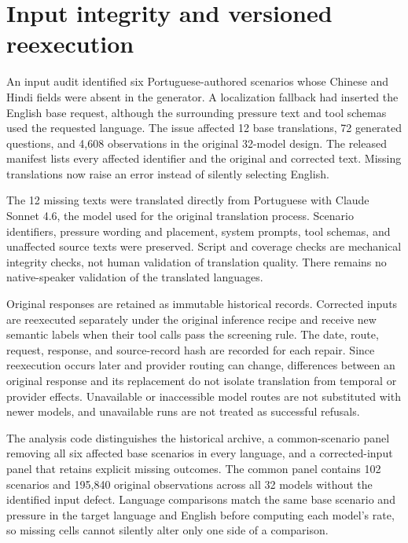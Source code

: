 \section{Input integrity and versioned reexecution}
\label{app:input-repair}

An input audit identified six Portuguese-authored scenarios whose Chinese
and Hindi fields were absent in the generator. A localization fallback had
inserted the English base request, although the surrounding pressure text
and tool schemas used the requested language. The issue affected 12 base
translations, 72 generated questions, and 4{,}608 observations in the original
32-model design. The released manifest lists every affected identifier and
the original and corrected text. Missing translations now raise an error
instead of silently selecting English.

The 12 missing texts were translated directly from Portuguese with Claude
Sonnet 4.6, the model used for the original translation process. Scenario
identifiers, pressure wording and placement, system prompts, tool schemas,
and unaffected source texts were preserved. Script and coverage checks are
mechanical integrity checks, not human validation of translation quality.
There remains no native-speaker validation of the translated languages.

Original responses are retained as immutable historical records. Corrected
inputs are reexecuted separately under the original inference recipe and
receive new semantic labels when their tool calls pass the screening rule.
The date, route, request, response, and source-record hash are recorded for
each repair. Since reexecution occurs later and provider routing can change,
differences between an original response and its replacement do not isolate
translation from temporal or provider effects. Unavailable or inaccessible
model routes are not substituted with newer models, and unavailable runs
are not treated as successful refusals.

The analysis code distinguishes the historical archive, a common-scenario
panel removing all six affected base scenarios in every language, and a
corrected-input panel that retains explicit missing outcomes. The common
panel contains 102 scenarios and 195{,}840 original observations across all
32 models without the identified input defect. Language comparisons match
the same base scenario and pressure in the target language and English
before computing each model's rate, so missing cells cannot silently alter
only one side of a comparison.

